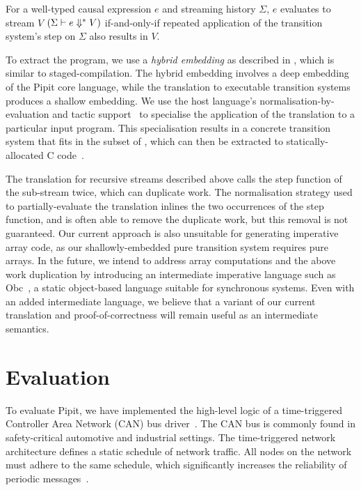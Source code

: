 \documentclass[a4paper,UKenglish,cleveref, autoref, thm-restate,anonymous]{lipics-v2021}
\begin{document}
\begin{theorem}
  For a well-typed causal expression $e$ and streaming history $\Sigma$, $e$ evaluates to stream $V$ $(\Sigma \vdash e \Downarrow^{*} V)$ if-and-only-if repeated application of the transition system's step on $\Sigma$ also results in $V$.
\end{theorem}

To extract the program, we use a \emph{hybrid embedding} as described in \cite{ho2022noise}, which is similar to staged-compilation.
The hybrid embedding involves a deep embedding of the Pipit core language, while the translation to executable transition systems produces a shallow embedding.
We use the \fstar{} host language's normalisation-by-evaluation and tactic support~\cite{martinez2019meta} to specialise the application of the translation to a particular input program.
This specialisation results in a concrete transition system that fits in the \lowstar{} subset of \fstar{}, which can then be extracted to statically-allocated C code~\cite{protzenko2017verified}.

The translation for recursive streams described above calls the step function of the sub-stream twice, which can duplicate work.
The normalisation strategy used to partially-evaluate the translation inlines the two occurrences of the step function, and is often able to remove the duplicate work, but this removal is not guaranteed.
Our current approach is also unsuitable for generating imperative array code, as our shallowly-embedded pure transition system requires pure arrays.
In the future, we intend to address array computations and the above work duplication by introducing an intermediate imperative language such as Obc~\cite{biernacki2008clock}, a static object-based language suitable for synchronous systems.
Even with an added intermediate language, we believe that a variant of our current translation and proof-of-correctness will remain useful as an intermediate semantics.
 

\section{Evaluation}
\label{s:evaluation}

To evaluate Pipit, we have implemented the high-level logic of a time-triggered Controller Area Network (CAN) bus driver~\cite{ISO11898_4}.
The CAN bus is commonly found in safety-critical automotive and industrial settings.
The time-triggered network architecture defines a static schedule of network traffic.
All nodes on the network must adhere to the same schedule, which significantly increases the reliability of periodic messages~\cite{fuehrer2001time}.
\end{document}
